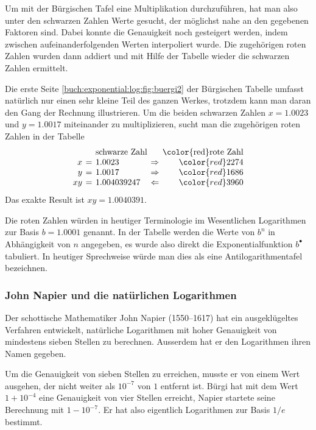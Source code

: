 Um mit der Bürgischen Tafel eine Multiplikation durchzuführen,
hat man also unter den schwarzen Zahlen Werte gesucht,
der möglichst nahe an den gegebenen Faktoren sind.
Dabei konnte die Genauigkeit noch gesteigert werden, indem zwischen
aufeinanderfolgenden Werten interpoliert wurde.
Die zugehörigen roten Zahlen wurden dann addiert und mit Hilfe der
Tabelle wieder die schwarzen Zahlen ermittelt.

\begin{beispiel}
Die erste Seite \ref{buch:exponential:log:fig:buergi2} der Bürgischen
Tabelle umfasst natürlich nur einen sehr kleine Teil des ganzen Werkes,
trotzdem kann man daran den Gang der Rechnung illustrieren.
Um die beiden schwarzen Zahlen $x=1.0023$ und $y=1.0017$ miteinander
zu multiplizieren, sucht man die zugehörigen roten Zahlen in
der Tabelle
\[
\renewcommand{\arraycolsep}{2pt}
\begin{array}{rclcr}
            & &\text{schwarze Zahl}&&\text{{\color{red}rote Zahl}} \\
           x&=&1.0023      &\Rightarrow&{\color{red}2274}\\
           y&=&1.0017      &\Rightarrow&{\color{red}1686}\\
          xy&=&1.004039247 &\Leftarrow &{\color{red}3960}
\end{array}
\]
Das exakte Result ist $xy=1.0040391$.
\end{beispiel}

Die roten Zahlen würden in heutiger Terminologie
im Wesentlichen Logarithmen zur Basis $b=1.0001$ genannt.
In der Tabelle werden die Werte von $b^n$ in Abhängigkeit von $n$
angegeben, es wurde also direkt die Exponentialfunktion $b^\bullet$
tabuliert.
In heutiger Sprechweise würde man dies als eine Antilogarithmentafel
bezeichnen.

\subsubsection{John Napier und die natürlichen Logarithmen}
Der schottische Mathematiker John Napier (1550--1617) hat ein
ausgeklügeltes Verfahren entwickelt, 
natürliche Logarithmen mit hoher Genauigkeit von mindestens sieben
Stellen zu berechnen.
Ausserdem hat er den Logarithmen ihren Namen gegeben.

Um die Genauigkeit von sieben Stellen zu erreichen, musste er von
einem Wert ausgehen, der nicht weiter als $10^{-7}$ von $1$ entfernt
ist.
Bürgi hat mit dem Wert $1+10^{-4}$ eine Genauigkeit von vier Stellen
erreicht, Napier startete seine Berechnung mit $1-10^{-7}$.
Er hat also eigentlich Logarithmen zur Basis $1/e$ bestimmt.

